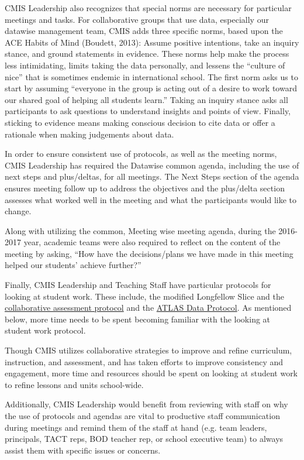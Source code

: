 \documentclass{report}
\begin{document}
\begin{findings}
CMIS Leadership also recognizes that special norms are necessary for particular meetings and tasks. For collaborative groups that use data, especially our datawise management team, CMIS adds three specific norms, based upon the ACE Habits of Mind (Boudett, 2013): Assume positive intentions, take an inquiry stance, and ground statements in evidence. These norms help make the process less intimidating, limits taking the data personally, and lessens the “culture of nice” that is sometimes endemic in international school. The first norm asks us to start by assuming “everyone in the group is acting out of a desire to work toward our shared goal of helping all students learn.” Taking an inquiry stance asks all participants to ask questions to understand insights and points of view. Finally, sticking to evidence means making conscious decision to cite data or offer a rationale when making judgements about data. 

In order to ensure consistent use of protocols, as well as the meeting norms, CMIS Leadership has required the Datawise common agenda, including the use of next steps and plus/deltas, for all meetings. The  Next Steps section of the  agenda ensures meeting follow up to address the objectives and the plus/delta section assesses what worked well in the meeting and what the participants would like to change. 

Along with utilizing the common, Meeting wise meeting agenda, during the 2016-2017 year, academic teams were also required to reflect on the content of the meeting by asking, “How have the decisions/plans we have made in this meeting helped our students’ achieve further?”

Finally, CMIS Leadership and Teaching Staff have particular protocols for looking at student work. These include, the modified Longfellow Slice and the \href{https://docs.google.com/a/cmis.ac.th/document/d/1vC3OD8DgzLVl3_FikEvwSYsbSwEngsDfMOKV6fl7k9M/edit?usp=sharing}{collaborative assessment protocol} and the \href{https://docs.google.com/a/cmis.ac.th/document/d/1cVbpi_Fs4PP7foojiq3we0WA3RK4TuYiI9ConlNRPtI/edit?usp=sharing}{ATLAS Data Protocol}. As mentioned below, more time needs to be spent becoming familiar with the looking at student work protocol. 


Though CMIS utilizes collaborative strategies to improve and refine curriculum, instruction, and assessment, and has taken efforts to improve consistency and engagement, more time and resources should be spent on looking at student work to refine lessons and units school-wide.

Additionally, CMIS Leadership would benefit from reviewing with staff on why the use of protocols and agendas are vital to productive staff communication during meetings and remind them of the staff at hand (e.g. team leaders, principals, TACT reps, BOD teacher rep, or school executive team) to always assist them with specific issues or concerns.
\end{findings}
\end{document}
